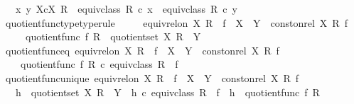\begin{isabellebody}
\ \ \ \ {\isasymlangle}x{\isacharcomma}{\kern0pt}\ y{\isasymrangle}\ {\isasymin}\isactrlbsub X{\isasymtimes}\isactrlsub cX\isactrlesub \ R\ {\isasymlongleftrightarrow}\ equiv{\isacharunderscore}{\kern0pt}class\ R\ {\isasymcirc}\isactrlsub c\ x\ {\isacharequal}{\kern0pt}\ equiv{\isacharunderscore}{\kern0pt}class\ R\ {\isasymcirc}\isactrlsub c\ y{\isachardoublequoteclose}\ \isanewline
\ \ quotient{\isacharunderscore}{\kern0pt}func{\isacharunderscore}{\kern0pt}type{\isacharbrackleft}{\kern0pt}type{\isacharunderscore}{\kern0pt}rule{\isacharbrackright}{\kern0pt}{\isacharcolon}{\kern0pt}\ \isanewline
\ \ \ \ {\isachardoublequoteopen}equiv{\isacharunderscore}{\kern0pt}rel{\isacharunderscore}{\kern0pt}on\ X\ R\ {\isasymLongrightarrow}\ f\ {\isacharcolon}{\kern0pt}\ X\ {\isasymrightarrow}\ Y\ {\isasymLongrightarrow}\ {\isacharparenleft}{\kern0pt}const{\isacharunderscore}{\kern0pt}on{\isacharunderscore}{\kern0pt}rel\ X\ R\ f{\isacharparenright}{\kern0pt}\ {\isasymLongrightarrow}\isanewline
\ \ \ \ \ \ quotient{\isacharunderscore}{\kern0pt}func\ f\ R\ {\isacharcolon}{\kern0pt}\ quotient{\isacharunderscore}{\kern0pt}set\ X\ R\ {\isasymrightarrow}\ Y{\isachardoublequoteclose}\ \ \isanewline
\ \ quotient{\isacharunderscore}{\kern0pt}func{\isacharunderscore}{\kern0pt}eq{\isacharcolon}{\kern0pt}\ {\isachardoublequoteopen}equiv{\isacharunderscore}{\kern0pt}rel{\isacharunderscore}{\kern0pt}on\ X\ R\ {\isasymLongrightarrow}\ f\ {\isacharcolon}{\kern0pt}\ X\ {\isasymrightarrow}\ Y\ {\isasymLongrightarrow}\ {\isacharparenleft}{\kern0pt}const{\isacharunderscore}{\kern0pt}on{\isacharunderscore}{\kern0pt}rel\ X\ R\ f{\isacharparenright}{\kern0pt}\ {\isasymLongrightarrow}\isanewline
\ \ \ \ \ quotient{\isacharunderscore}{\kern0pt}func\ f\ R\ {\isasymcirc}\isactrlsub c\ equiv{\isacharunderscore}{\kern0pt}class\ R\ {\isacharequal}{\kern0pt}\ f{\isachardoublequoteclose}\ \ \ \isanewline
\ \ quotient{\isacharunderscore}{\kern0pt}func{\isacharunderscore}{\kern0pt}unique{\isacharcolon}{\kern0pt}\ {\isachardoublequoteopen}equiv{\isacharunderscore}{\kern0pt}rel{\isacharunderscore}{\kern0pt}on\ X\ R\ {\isasymLongrightarrow}\ f\ {\isacharcolon}{\kern0pt}\ X\ {\isasymrightarrow}\ Y\ {\isasymLongrightarrow}\ {\isacharparenleft}{\kern0pt}const{\isacharunderscore}{\kern0pt}on{\isacharunderscore}{\kern0pt}rel\ X\ R\ f{\isacharparenright}{\kern0pt}\ {\isasymLongrightarrow}\isanewline
\ \ \ \ h\ {\isacharcolon}{\kern0pt}\ quotient{\isacharunderscore}{\kern0pt}set\ X\ R\ {\isasymrightarrow}\ Y\ {\isasymLongrightarrow}\ h\ {\isasymcirc}\isactrlsub c\ equiv{\isacharunderscore}{\kern0pt}class\ R\ {\isacharequal}{\kern0pt}\ f\ {\isasymLongrightarrow}\ h\ {\isacharequal}{\kern0pt}\ quotient{\isacharunderscore}{\kern0pt}func\ f\ R{\isachardoublequoteclose}%

\end{isabellebody}
